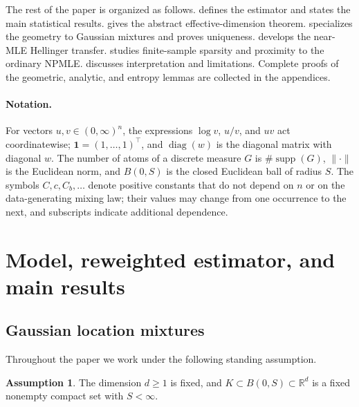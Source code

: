 \documentclass[11pt]{article}
\theoremstyle{definition}
\newtheorem{assumption}{Assumption}
\theoremstyle{remark}
\DeclareMathOperator{\supp}{supp}
\DeclareMathOperator{\diag}{diag}
\newcommand{\RR}{\mathbb R}
\newcommand{\one}{\bm 1}
\newcommand{\norm}[1]{\lVert #1\rVert}
\begin{document}
The rest of the paper is organized as follows.   defines the
estimator and states the main statistical results.  
gives the abstract effective-dimension theorem.  
specializes the geometry to Gaussian mixtures and proves uniqueness.
 develops the near-MLE Hellinger transfer.
 studies finite-sample sparsity and proximity to the
ordinary NPMLE.   discusses interpretation and
limitations.  Complete proofs of the geometric, analytic, and entropy lemmas
are collected in the appendices.

\paragraph{Notation.}
For vectors $u,v\in(0,\infty)^n$, the expressions $\log v$, $u/v$, and $uv$
act coordinatewise; $\one=(1,\ldots,1)^\top$, and $\diag(w)$ is the diagonal
matrix with diagonal $w$.  The number of atoms of a discrete measure $G$ is
$\#\supp(G)$, $\norm{\cdot}$ is the Euclidean norm, and $B(0,S)$ is the
closed Euclidean ball of radius $S$.  The symbols $C,c,C_b,\ldots$ denote
positive constants that do not depend on $n$ or on the data-generating
mixing law; their values may change from one occurrence to the next, and
subscripts indicate additional dependence.

\section{Model, reweighted estimator, and main results}\label{sec:model}

\subsection{Gaussian location mixtures}

Throughout the paper we work under the following standing assumption.

\begin{assumption}\label{ass:standing}
The dimension $d\ge1$ is fixed, and $K\subset B(0,S)\subset\RR^d$ is a
fixed nonempty compact set with $S<\infty$.
\end{assumption}
\end{document}
